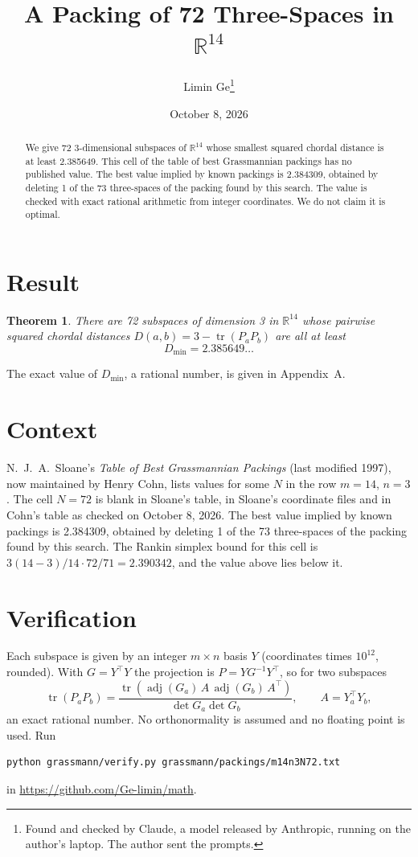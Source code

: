 \documentclass[11pt,a4paper]{article}
\title{A Packing of 72 Three-Spaces in $\mathbb{R}^{14}$}
\author{Limin Ge\thanks{Found and checked by Claude, a model released by Anthropic, running on the author's laptop. The author sent the prompts.}}
\date{October 8, 2026}
\newtheorem*{theorem}{Theorem}
\begin{document}
\maketitle
\begin{abstract}
We give 72 3-dimensional subspaces of $\mathbb{R}^{14}$ whose smallest squared chordal distance is at least 2.385649. This cell of the table of best Grassmannian packings has no published value. The best value implied by known packings is 2.384309, obtained by deleting 1 of the 73 three-spaces of the packing found by this search. The value is checked with exact rational arithmetic from integer coordinates. We do not claim it is optimal.
\end{abstract}

\section{Result}
\begin{theorem}
There are 72 subspaces of dimension 3 in $\mathbb{R}^{14}$ whose pairwise squared chordal distances $D(a,b) = 3 - \operatorname{tr}(P_aP_b)$ are all at least
\[ D_{\min} = 2.385649\ldots \]
\end{theorem}
The exact value of $D_{\min}$, a rational number, is given in Appendix~A.


\section{Context}
N.~J.~A.~Sloane's \emph{Table of Best Grassmannian Packings} (last modified 1997), now maintained by Henry Cohn, lists values for some $N$ in the row $m=14$, $n=3$. The cell $N=72$ is blank in Sloane's table, in Sloane's coordinate files and in Cohn's table as checked on October 8, 2026. The best value implied by known packings is 2.384309, obtained by deleting 1 of the 73 three-spaces of the packing found by this search. The Rankin simplex bound for this cell is $3(14-3)/14\cdot 72/71 = 2.390342$, and the value above lies below it.


\section{Verification}
Each subspace is given by an integer $m\times n$ basis $Y$ (coordinates times $10^{12}$, rounded). With $G=Y^\top Y$ the projection is $P=YG^{-1}Y^\top$, so for two subspaces
\[ \operatorname{tr}(P_aP_b)=\frac{\operatorname{tr}(\operatorname{adj}(G_a)\,A\,\operatorname{adj}(G_b)\,A^\top)}{\det G_a\det G_b},\qquad A=Y_a^\top Y_b, \]
an exact rational number. No orthonormality is assumed and no floating point is used. Run
\begin{verbatim}
python grassmann/verify.py grassmann/packings/m14n3N72.txt
\end{verbatim}
in \url{https://github.com/Ge-limin/math}.
\end{document}
